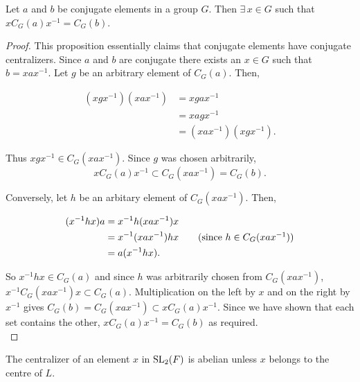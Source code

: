 

\begin{proposition}
    \label{conjugate_centralizers_of_IsConj}
    \leanok
    Let $a$ and $b$ be conjugate elements in a group $G$. Then $\exists \, x \in G$ such that $xC_G(a)x^{-1} = C_G(b)$. \vspace{3mm}
\end{proposition}
\begin{proof}
\leanok
This proposition essentially claims that conjugate elements have conjugate centralizers. Since $a$ and $b$ are conjugate there exists an $x \! \in \! G$ such that $b = xax^{-1}$. Let $g$ be an arbitrary element of $C_G(a)$. Then,

\begin{align*} (xgx^{-1})(xax^{-1}) &= xgax^{-1}\\
&= xagx^{-1} \tag{since $g \in C_G(a)$}\\
&= (xax^{-1})(xgx^{-1}). \end{align*}

Thus $xgx^{-1} \in C_G(xax^{-1})$. Since $g$ was chosen arbitrarily, $$xC_G(a)x^{-1} \subset C_G(xax^{-1}) = C_G(b).$$ 

Conversely, let $h$ be an arbitary element of $C_G(xax^{-1})$. Then,

\begin{align*} (x^{-1}hx)a &= x^{-1}h(xax^{-1})x \\
&= x^{-1}(xax^{-1})hx \tag{since $h \in C_G(xax^{-1})$} \\
&= a(x^{-1}hx). \end{align*}

So $x^{-1}hx \in C_G(a)$ and since $h$ was arbitrarily chosen from $C_G(xax^{-1})$, \linebreak $x^{-1}C_G(xax^{-1})x \subset C_G(a)$. Multiplication on the left by $x$ and on the right by $x^{-1}$ gives $C_G(b) =  C_G(xax^{-1}) \subset xC_G(a)x^{-1}$. Since we have shown that each set contains the other, $xC_G(a)x^{-1} = C_G(b)$ as required. \\
\end{proof}




\begin{corollary}
    \label{IsCommutative_centralizer_of_not_mem_center}
    \leanok
The centralizer of an element $x$ in $\operatorname{SL}_2(F)$ is abelian unless $x$ belongs to the centre of $L$. \vspace{3mm}
\end{corollary}

